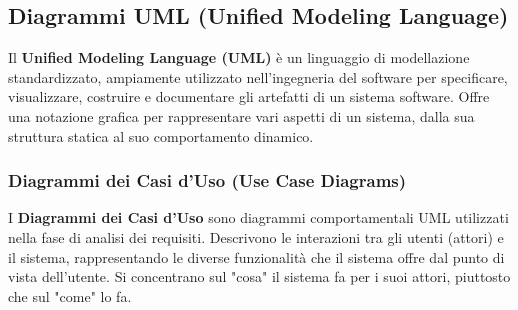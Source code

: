 \subsection{Diagrammi UML (Unified Modeling Language)}
Il \textbf{Unified Modeling Language (UML)} è un linguaggio di modellazione standardizzato, ampiamente utilizzato nell'ingegneria del software per specificare, visualizzare, costruire e documentare gli artefatti di un sistema software. Offre una notazione grafica per rappresentare vari aspetti di un sistema, dalla sua struttura statica al suo comportamento dinamico.

\subsubsection{Diagrammi dei Casi d'Uso (Use Case Diagrams)}
I \textbf{Diagrammi dei Casi d'Uso} sono diagrammi comportamentali UML utilizzati nella fase di analisi dei requisiti. Descrivono le interazioni tra gli utenti (attori) e il sistema, rappresentando le diverse funzionalità che il sistema offre dal punto di vista dell'utente. Si concentrano sul "cosa" il sistema fa per i suoi attori, piuttosto che sul "come" lo fa.
